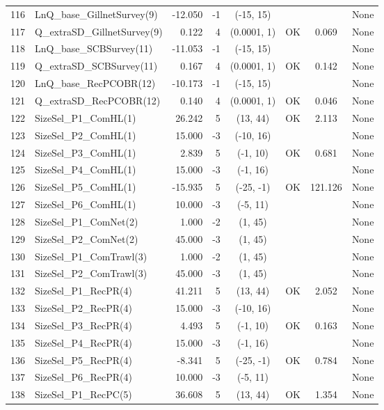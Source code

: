 \documentclass[12pt,]{article}
\begin{document}
\begin{landscape}
\begin{longtable}{rlrrcccl}
  116 & LnQ\_base\_GillnetSurvey(9) & -12.050 & -1 & (-15, 15) &  &  & None \\ 
  117 & Q\_extraSD\_GillnetSurvey(9) & 0.122 & 4 & (0.0001, 1) & OK & 0.069 & None \\ 
  118 & LnQ\_base\_SCBSurvey(11) & -11.053 & -1 & (-15, 15) &  &  & None \\ 
  119 & Q\_extraSD\_SCBSurvey(11) & 0.167 & 4 & (0.0001, 1) & OK & 0.142 & None \\ 
  120 & LnQ\_base\_RecPCOBR(12) & -10.173 & -1 & (-15, 15) &  &  & None \\ 
  121 & Q\_extraSD\_RecPCOBR(12) & 0.140 & 4 & (0.0001, 1) & OK & 0.046 & None \\ 
  122 & SizeSel\_P1\_ComHL(1) & 26.242 & 5 & (13, 44) & OK & 2.113 & None \\ 
  123 & SizeSel\_P2\_ComHL(1) & 15.000 & -3 & (-10, 16) &  &  & None \\ 
  124 & SizeSel\_P3\_ComHL(1) & 2.839 & 5 & (-1, 10) & OK & 0.681 & None \\ 
  125 & SizeSel\_P4\_ComHL(1) & 15.000 & -3 & (-1, 16) &  &  & None \\ 
  126 & SizeSel\_P5\_ComHL(1) & -15.935 & 5 & (-25, -1) & OK & 121.126 & None \\ 
  127 & SizeSel\_P6\_ComHL(1) & 10.000 & -3 & (-5, 11) &  &  & None \\ 
  128 & SizeSel\_P1\_ComNet(2) & 1.000 & -2 & (1, 45) &  &  & None \\ 
  129 & SizeSel\_P2\_ComNet(2) & 45.000 & -3 & (1, 45) &  &  & None \\ 
  130 & SizeSel\_P1\_ComTrawl(3) & 1.000 & -2 & (1, 45) &  &  & None \\ 
  131 & SizeSel\_P2\_ComTrawl(3) & 45.000 & -3 & (1, 45) &  &  & None \\ 
  132 & SizeSel\_P1\_RecPR(4) & 41.211 & 5 & (13, 44) & OK & 2.052 & None \\ 
  133 & SizeSel\_P2\_RecPR(4) & 15.000 & -3 & (-10, 16) &  &  & None \\ 
  134 & SizeSel\_P3\_RecPR(4) & 4.493 & 5 & (-1, 10) & OK & 0.163 & None \\ 
  135 & SizeSel\_P4\_RecPR(4) & 15.000 & -3 & (-1, 16) &  &  & None \\ 
  136 & SizeSel\_P5\_RecPR(4) & -8.341 & 5 & (-25, -1) & OK & 0.784 & None \\ 
  137 & SizeSel\_P6\_RecPR(4) & 10.000 & -3 & (-5, 11) &  &  & None \\ 
  138 & SizeSel\_P1\_RecPC(5) & 36.608 & 5 & (13, 44) & OK & 1.354 & None \\ 

\end{longtable}
\end{landscape}
\end{document}
